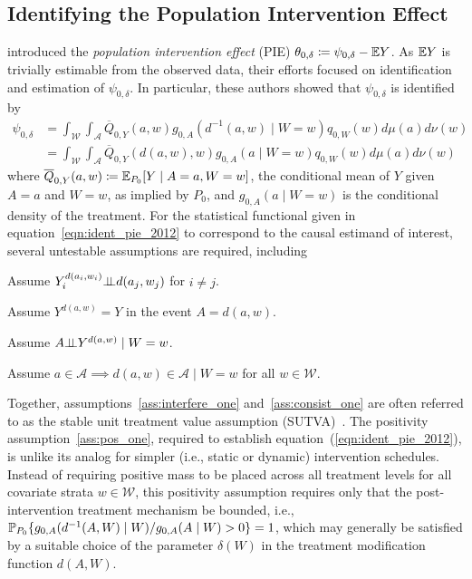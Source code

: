 \subsection{Identifying the Population Intervention Effect}\label{one_pie_param}

\citet{diaz2012population} introduced the \textit{population intervention
effect} (PIE) $\theta_{0, \delta} \coloneqq \psi_{0, \delta} - \mathbb{E} Y$. As $\mathbb{E} Y$
is trivially estimable from the observed data, their efforts focused on
identification and estimation of $\psi_{0,\delta}$. In particular, these authors
showed that $\psi_{0, \delta}$ is identified by
\begin{align}\label{eqn:ident_pie_2012}
  \psi_{0,\delta} &= \int_{\mathcal{W}} \int_{\mathcal{A}}
  \overline{Q}_{0,Y}(a, w) g_{0, A}(d^{-1}(a, w) \mid W = w)
  q_{0, W}(w) d\mu(a)d\nu(w) \nonumber \\
  &= \int_{\mathcal{W}} \int_{\mathcal{A}}
  \overline{Q}_{0,Y}(d(a, w), w) g_{0, A}(a \mid W = w)
  q_{0, W}(w) d\mu(a)d\nu(w)
\end{align}
where $\overline{Q}_{0,Y}(a,w) \coloneqq \mathbb{E}_{P_0}[Y \mid A = a, W = w]$, the
conditional mean of $Y$ given $A = a$ and $W = w$, as implied by $P_0$, and
$g_{0,A}(a \mid W = w)$ is the conditional density of the treatment. For the
statistical functional given in equation~\ref{eqn:ident_pie_2012} to
correspond to the causal estimand of interest, several untestable assumptions
are required, including
\begin{assumptioniden}
  Assume $Y^{d(a_i, w_i)}_i \mbox{$\perp\!\!\!\perp$} d(a_j, w_j)$ for $i \neq j$.
  \label{ass:interfere_one}
\end{assumptioniden}
\begin{assumptioniden}[Consistency]
  Assume $Y^{d(a, w)} = Y$ in the event $A = d(a, w)$.
  \label{ass:consist_one}
\end{assumptioniden}
\begin{assumptioniden}
  Assume $A \mbox{$\perp\!\!\!\perp$} Y^{d(a, w)} \mid W = w$.
  \label{ass:nuc_one}
\end{assumptioniden}
\begin{assumptioniden}[Positivity]
  Assume $a \in \mathcal{A} \implies d(a, w) \in \mathcal{A} \mid
  W = w$ for all $w \in \mathcal{W}$.
  \label{ass:pos_one}
\end{assumptioniden}
Together, assumptions~\ref{ass:interfere_one} and~\ref{ass:consist_one} are often
referred to as the stable unit treatment value assumption
(SUTVA)~\citep{rubin1978bayesian,rubin1980randomization}. The positivity
assumption~\ref{ass:pos_one}, required to establish
equation~(\ref{eqn:ident_pie_2012}), is unlike its analog for simpler (i.e.,
static or dynamic) intervention schedules. Instead of requiring positive mass to
be placed across all treatment levels for all covariate strata $w \in
\mathcal{W}$, this positivity assumption requires only that the
post-intervention treatment mechanism be bounded, i.e., $\mathbb{P}_{P_0}
\{g_{0,A}(d^{-1}(A, W) \mid W) / g_{0,A}(A \mid W) > 0 \} = 1$, which may
generally be satisfied by a suitable choice of the parameter $\delta(W)$ in the
treatment modification function $d(A,W)$.

